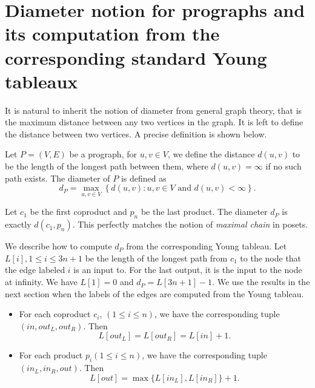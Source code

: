 \section{Diameter notion for prographs and its computation from the corresponding standard Young tableaux}

It is natural to inherit the notion of diameter from general graph theory, that is the maximum distance between any two vertices in the graph. It is left to define the distance between two vertices. A precise definition is shown below.

\begin{definition}
  Let $P=(V,E)$ be a prograph, for $u,v\in V$, we define the distance $d(u,v)$ to be the length of the longest path between them, where $d(u,v)=\infty$ if no such path exists. The diameter of $P$ is defined as
  $$d_P = \max_{u,v \in V} \left\{d(u,v) : u,v \in V \text{ and } d(u,v) < \infty\right\}.$$
\end{definition}

Let $c_1$ be the first coproduct and $p_n$ be the last product. The diameter $d_P$ is exactly $d(c_1,p_n)$. This perfectly matches the notion of \textit{maximal chain} in posets.

We describe how to compute $d_P$ from the corresponding Young tableau. Let $L[i], 1\le i\le 3n+1$ be the length of the longest path from $c_1$ to the node that the edge labeled $i$ is an input to. For the last output, it is the input to the node at infinity. We have $L[1]=0$ and $d_P = L[3n+1]-1$. We use the results in the next section when the labels of the edges are computed from the Young tableau.

\begin{itemize}
  \item For each coproduct $c_i$, $(1\le i\le n)$, we have the corresponding tuple $(in, out_L, out_R)$. Then
        $$L[out_L] = L[out_R] = L[in]+1.$$
  \item For each product $p_i (1\le i\le n)$, we have the corresponding tuple $(in_L, in_R, out)$. Then
        $$L[out] = \max\{L[in_L], L[in_R]\} + 1.$$
\end{itemize}


